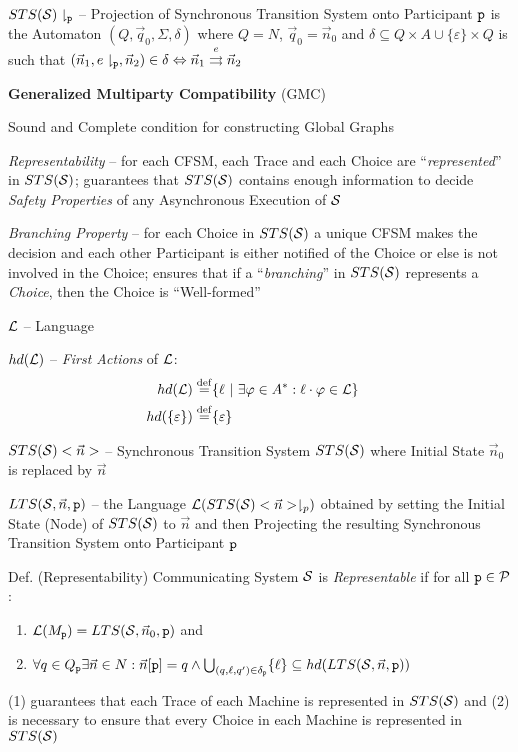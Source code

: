 $STS(\mathcal{S})\downharpoonright_\mathtt{p}$ -- Projection of
Synchronous Transition System onto Participant $\mathtt{p}$ is the
Automaton $(Q, \vec{q}_0, \Sigma, \delta)$ where $Q = N$, $\vec{q}_0 =
\vec{n}_0$ and $\delta \subseteq Q \times A \cup \{\varepsilon\}
\times Q$ is such that $(\vec{n}_1, e\downharpoonright_\mathtt{p},
\vec{n}_2) \in \delta \Leftrightarrow \vec{n}_1
\stackrel{e}{\rightrightarrows} \vec{n}_2$


\textbf{Generalized Multiparty Compatibility} (GMC)

Sound and Complete condition for constructing Global Graphs

\emph{Representability} -- for each CFSM, each Trace and each Choice
are ``\emph{represented}'' in $STS(\mathcal{S})$; guarantees that
$STS(\mathcal{S})$ contains enough information to decide \emph{Safety
  Properties} of any Asynchronous Execution of $\mathcal{S}$

\emph{Branching Property} -- for each Choice in $STS(\mathcal{S})$ a
unique CFSM makes the decision and each other Participant is either
notified of the Choice or else is not involved in the Choice; ensures
that if a ``\emph{branching}'' in $STS(\mathcal{S})$ represents a
\emph{Choice}, then the Choice is ``Well-formed''


$\mathcal{L}$ -- Language

$hd(\mathcal{L})$ -- \emph{First Actions} of $\mathcal{L}$:
\begin{align*}
  hd(\mathcal{L}) \stackrel{\mathrm{def}}=& \{ \ell \ |\ \exists\varphi \in A^*
    : \ell\cdot\varphi \in \mathcal{L} \} & \\
  hd(\{\varepsilon\}) \stackrel{\mathrm{def}}=& \{ \varepsilon \} &
\end{align*}

$STS(\mathcal{S})<\vec{n}>$ -- Synchronous Transition System
$STS(\mathcal{S})$ where Initial State $\vec{n}_0$ is replaced by
$\vec{n}$

$LTS(\mathcal{S},\vec{n},\mathtt{p})$ -- the Language
$\mathcal{L}(STS(\mathcal{S})<\vec{n}>\downharpoonright_p)$ obtained by
setting the Initial State (Node) of $STS(\mathcal{S})$ to $\vec{n}$ and
then Projecting the resulting Synchronous Transition System onto
Participant $\mathtt{p}$


Def. (Representability) Communicating System $\mathcal{S}$ is
\emph{Representable} if for all $\mathtt{p} \in \mathcal{P}$:
\begin{enumerate}
  \item $\mathcal{L}(M_\mathtt{p}) = LTS(\mathcal{S},\vec{n}_0,\mathtt{p})$ and
  \item $\forall q \in Q_\mathtt{p} \exists \vec{n} \in N :
    \vec{n}[\mathtt{p}] = q \wedge
      \bigcup_{(q,\ell,q')\in\delta_\mathtt{p}} \{ \ell \}
        \subseteq hd(LTS(\mathcal{S},\vec{n},\mathtt{p}))$
\end{enumerate}
(1) guarantees that each Trace of each Machine is represented in
$STS(\mathcal{S})$ and (2) is necessary to ensure that every Choice in
each Machine is represented in $STS(\mathcal{S})$

